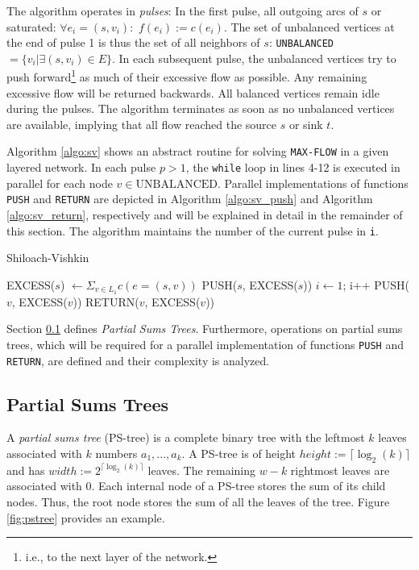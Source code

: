 \documentclass[a4paper,10pt, twocolumn]{article}
\begin{document}
The algorithm operates in \emph{pulses}: In the first pulse, all outgoing arcs of $s$ or saturated: $\forall e_i = (s, v_i):$ $f(e_i) := c(e_i)$. The set of unbalanced vertices at the end of pulse 1 is thus the set of all neighbors of $s$: \lstinline|UNBALANCED| $= \{v_i\lvert \exists (s, v_i) \in E \}$. In each subsequent pulse, the unbalanced vertices try to push forward\footnote{i.e., to the next layer of the network.} as much of their excessive flow as possible. Any remaining excessive flow will be returned backwards. All balanced vertices remain idle during the pulses. The algorithm terminates as soon as no unbalanced vertices are available, implying that all flow reached the source $s$ or sink $t$.

Algorithm \ref{algo:sv} shows an abstract routine for solving \lstinline|MAX-FLOW| in a given layered network. In each pulse $p>1$, the \lstinline|while| loop in lines 4-12 is executed in parallel for each node $v \in \mathrm{UNBALANCED}$. Parallel implementations of functions \lstinline|PUSH| and \lstinline|RETURN| are depicted in Algorithm \ref{algo:sv_push} and Algorithm \ref{algo:sv_return}, respectively and will be explained in detail in the remainder of this section. The algorithm maintains the number of the current pulse in \texttt{i}.

\begin{algorithm}
\caption{Shiloach-Vishkin}
\label{algo:sv}
\begin{algorithmic}[1]
		\State EXCESS($s$) $ \gets \Sigma_{v \in L_1} c(e = (s,v))$
		\State PUSH($s$, EXCESS($s$))
		$i \gets 1$;
			\State i++
					\State PUSH($v$, EXCESS($v$))
				\EndIf
			\EndFor
			\State RETURN($v$, EXCESS($v$))
		\EndWhile
	\EndFunction
\end{algorithmic}
\end{algorithm}

Section \ref{sec:sv_pstrees} defines \emph{Partial Sums Trees}. Furthermore, operations on partial sums trees, which will be required for a parallel implementation of functions \lstinline|PUSH| and \lstinline|RETURN|, are defined and their complexity is analyzed. 

\subsection{Partial Sums Trees}
\label{sec:sv_pstrees}
A \emph{partial sums tree} (PS-tree) is a complete binary tree with the leftmost $k$ leaves associated with $k$ numbers $a_1,...,a_k$. A PS-tree is of height $height := \lceil \log_2(k) \rceil$ and has $width := 2^{\lceil \log_2(k) \rceil}$ leaves. The remaining $w - k$ rightmost leaves are associated with 0. Each internal node of a PS-tree stores the sum of its child nodes. Thus, the root node stores the sum of all the leaves of the tree. Figure \ref{fig:pstree} provides an example.
\end{document}
